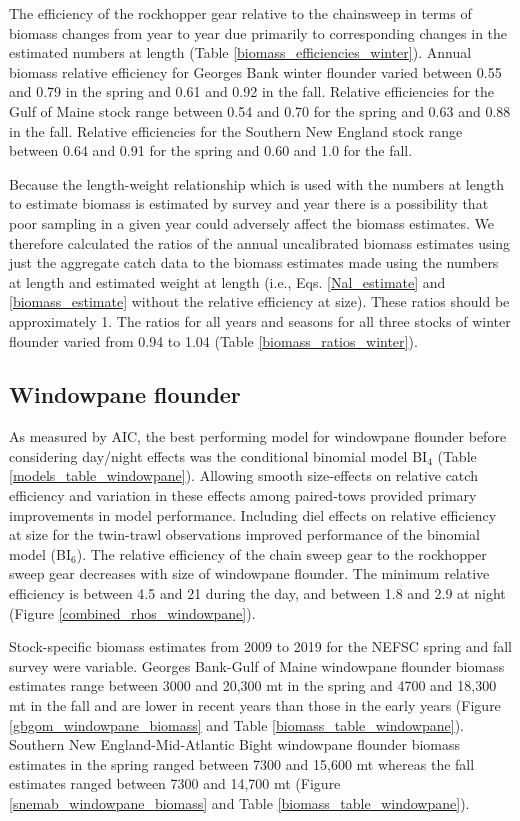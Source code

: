 \documentclass[]{article}
\begin{document}
The efficiency of the rockhopper gear relative to the chainsweep in
terms of biomass changes from year to year due primarily to
corresponding changes in the estimated numbers at length (Table
\ref{biomass_efficiencies_winter}). Annual biomass relative efficiency
for Georges Bank winter flounder varied between 0.55 and 0.79 in the
spring and 0.61 and 0.92 in the fall. Relative efficiencies for the Gulf
of Maine stock range between 0.54 and 0.70 for the spring and 0.63 and
0.88 in the fall. Relative efficiencies for the Southern New England
stock range between 0.64 and 0.91 for the spring and 0.60 and 1.0 for
the fall.

Because the length-weight relationship which is used with the numbers at
length to estimate biomass is estimated by survey and year there is a
possibility that poor sampling in a given year could adversely affect
the biomass estimates. We therefore calculated the ratios of the annual
uncalibrated biomass estimates using just the aggregate catch data to
the biomass estimates made using the numbers at length and estimated
weight at length (i.e., Eqs. \ref{Nal_estimate} and
\ref{biomass_estimate} without the relative efficiency at size). These
ratios should be approximately 1. The ratios for all years and seasons
for all three stocks of winter flounder varied from 0.94 to 1.04 (Table
\ref{biomass_ratios_winter}).

\hypertarget{windowpane-flounder}{%
\subsection{Windowpane flounder}\label{windowpane-flounder}}

As measured by AIC, the best performing model for windowpane flounder
before considering day/night effects was the conditional binomial model
BI\(_4\) (Table \ref{models_table_windowpane}). Allowing smooth
size-effects on relative catch efficiency and variation in these effects
among paired-tows provided primary improvements in model performance.
Including diel effects on relative efficiency at size for the twin-trawl
observations improved performance of the binomial model (BI\(_6\)). The
relative efficiency of the chain sweep gear to the rockhopper sweep gear
decreases with size of windowpane flounder. The minimum relative
efficiency is between 4.5 and 21 during the day, and between 1.8 and 2.9
at night (Figure \ref{combined_rhos_windowpane}).

Stock-specific biomass estimates from 2009 to 2019 for the NEFSC spring
and fall survey were variable. Georges Bank-Gulf of Maine windowpane
flounder biomass estimates range between 3000 and 20,300 mt in the
spring and 4700 and 18,300 mt in the fall and are lower in recent years
than those in the early years (Figure \ref{gbgom_windowpane_biomass} and
Table \ref{biomass_table_windowpane}). Southern New England-Mid-Atlantic
Bight windowpane flounder biomass estimates in the spring ranged between
7300 and 15,600 mt whereas the fall estimates ranged between 7300 and
14,700 mt (Figure \ref{snemab_windowpane_biomass} and Table
\ref{biomass_table_windowpane}).
\end{document}
